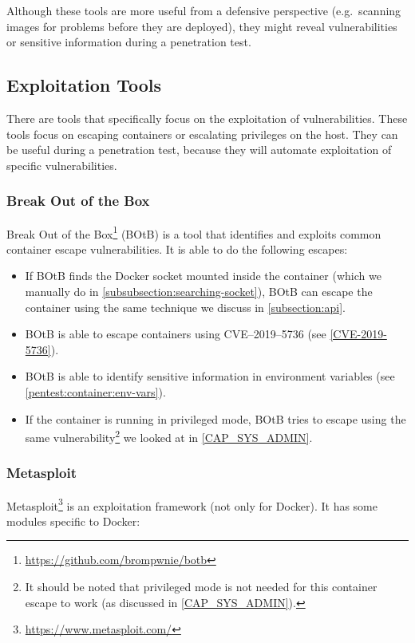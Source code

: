 Although these tools are more useful from a defensive perspective (e.g.\ scanning images for problems before they are deployed), they might reveal vulnerabilities or sensitive information during a penetration test.

\subsection{Exploitation Tools}\label{subsection:offensive-tools}
There are tools that specifically focus on the exploitation of vulnerabilities. These tools focus on escaping containers or escalating privileges on the host. They can be useful during a penetration test, because they will automate exploitation of specific vulnerabilities.

\subsubsection{Break Out of the Box}
Break Out of the Box\footnote{\url{https://github.com/brompwnie/botb}} (BOtB) is a tool that identifies and exploits common container escape vulnerabilities. It is able to do the following escapes:

\begin{itemize}
    \item If BOtB finds the Docker socket mounted inside the container (which we manually do in \autoref{subsubsection:searching-socket}), BOtB can escape the container using the same technique we discuss in \autoref{subsection:api}.

    \item BOtB is able to escape containers using CVE--2019--5736 (see \autoref{CVE-2019-5736}).

    \item BOtB is able to identify sensitive information in environment variables (see \autoref{pentest:container:env-vars}).

    \item If the container is running in privileged mode, BOtB tries to escape using the same vulnerability\cite{TrailOfBits-Docker-Escape}\footnote{It should be noted that privileged mode is not needed for this container escape to work (as discussed in \autoref{CAP_SYS_ADMIN}).} we looked at in \autoref{CAP_SYS_ADMIN}.
\end{itemize}

\subsubsection{Metasploit}
Metasploit\footnote{\url{https://www.metasploit.com/}} is an exploitation framework (not only for Docker). It has some modules specific to Docker:


